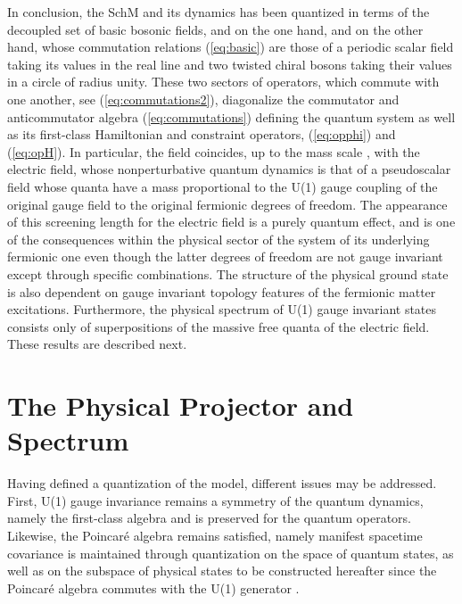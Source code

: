 \documentclass[a4paper,11pt]{article}
\begin{document}
In conclusion, the SchM and its dynamics has been quantized in terms of 
the decoupled set of basic bosonic fields, \coordHE{} and \coordHE{}
on the one hand, and \coordHE{} on the other hand, whose commutation 
relations (\ref{eq:basic}) are those of a periodic scalar field 
taking its values in the real line and two twisted chiral bosons 
taking their values in a circle of radius unity. These two sectors of 
operators, which commute with one another, see (\ref{eq:commutations2}), 
diagonalize the commutator and anticommutator algebra (\ref{eq:commutations}) 
defining the quantum system as well as its first-class Hamiltonian \coordHE{} and 
constraint \coordHE{} operators, (\ref{eq:opphi}) and (\ref{eq:opH}). In 
particular, the field \coordHE{} coincides, up to the mass scale \myHighlight{$\mu$}\coordHE{}, 
with the electric field, whose nonperturbative quantum dynamics 
is that of a pseudoscalar field whose quanta have a mass \myHighlight{$\mu$}\coordHE{} proportional 
to the U(1) gauge coupling \coordHE{} of the original gauge field \coordHE{} to
the original fermionic degrees of freedom. The appearance of this screening 
length \coordHE{} for the electric field is a purely quantum effect, and is 
one of the consequences within the physical sector of the system of its 
underlying fermionic one even though the latter degrees of freedom are
not gauge invariant except through specific combinations. The structure of 
the physical ground state is also dependent on gauge invariant topology 
features of the fermionic matter excitations. Furthermore, the phy\-si\-cal 
spectrum of U(1) gauge invariant states consists only of superpositions of the 
massive free quanta of the electric field. These results are described next.


\section{The Physical Projector and Spectrum}
\label{Sect5}

Having defined a quantization of the model, different issues may be
addressed. First, U(1) gauge invariance remains a symmetry of the quantum
dynamics, namely the first-class algebra \coordHE{} and
\coordHE{} is preserved for the quantum operators. Likewise,
the Poincar\'e algebra remains satisfied,\cite{Gaby} namely manifest spacetime
covariance is maintained through quantization on the space of quantum states,
as well as on the subspace of physical states to be constructed hereafter
since the Poincar\'e algebra commutes with the U(1) generator \myHighlight{$\phi$}\coordHE{}.
\end{document}
